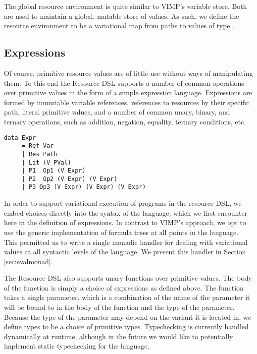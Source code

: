 \documentclass[12pt,oneside]{book}
\begin{document}
The global resource environment is quite similar to VIMP's variable store. Both are used to maintain
a global, mutable store of values. As such, we define the resource environment to be a variational map
from paths to values of type .

\subsection{Expressions}

Of course, primitive resource values are of little use without ways of manipulating them. To this end the Resource DSL supports
a number of common operations over primitive values in the form of a simple expression language. Expressions are formed by
immutable variable references, references to resources by their specific path, literal primitive values, and a number of common unary, binary, and ternary
operations, such as addition, negation, equality, ternary conditions, etc.

\begin{lstlisting}
data Expr
     = Ref Var    
     | Res Path                            
     | Lit (V PVal)           
     | P1  Op1 (V Expr)                    
     | P2  Op2 (V Expr) (V Expr)
     | P3 Op3 (V Expr) (V Expr) (V Expr)
\end{lstlisting}

In order to support variational execution of programs in the resource DSL, we embed choices directly into the syntax of the language, which
we first encounter here in the definition of expressions. In contrast to VIMP's approach, we opt to use the generic implementation of formula
trees at all points in the language. This permitted us to write a single monadic handler for dealing with variational values at all syntactic levels
of the language. We present this handler in Section \ref{sec:evalmonad}.

The Resource DSL also supports unary functions over primitive values. The body of the function is simply a choice of expressions as defined above.
The function takes a single parameter, which is a combination of the name of the parameter it will be bound to in the body of the function and the type of the parameter. Because the
type of the parameter may depend on the variant it is located in, we define types to be a choice of primitive types. Typechecking is currently handled dynamically at runtime,
although in the future we would like to potentially implement static typechecking for the language.
\end{document}
